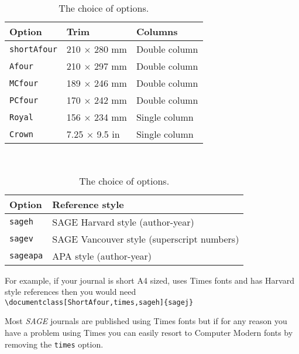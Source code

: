 \documentclass[Afour,sageh,times]{sagej}
\begin{document}
\begin{table}[h]
\small\sf\centering
\caption{The choice of options.\label{T1}}
\begin{tabular}{lll}
\toprule
Option&Trim&Columns\\
\midrule
\texttt{shortAfour}& 210 $\times$ 280 mm& Double column\\
\texttt{Afour} &210 $\times$ 297 mm& Double column\\
\texttt{MCfour} &189 $\times$ 246 mm& Double column\\
\texttt{PCfour} &170 $\times$ 242 mm& Double column\\
\texttt{Royal} &156 $\times$ 234 mm& Single column\\
\texttt{Crown} &7.25 $\times$ 9.5 in&Single column\\
\bottomrule
\end{tabular}\\[10pt]
\begin{tabular}{ll}
\toprule
Option&Reference style\\
\midrule
\texttt{sageh}&SAGE Harvard style (author-year)\\
\texttt{sagev}&SAGE Vancouver style (superscript numbers)\\
\texttt{sageapa}&APA style (author-year)\\
\bottomrule
\end{tabular}
\end{table}

For example, if your journal is short A4 sized, uses Times fonts and has Harvard style references then you would need\\
{\small\verb+\documentclass[ShortAfour,times,sageh]{sagej}+}

Most \textit{SAGE} journals are published using Times fonts but if for any reason you have a problem using Times you can
easily resort to Computer Modern fonts by removing the
\verb"times" option.
\end{document}
